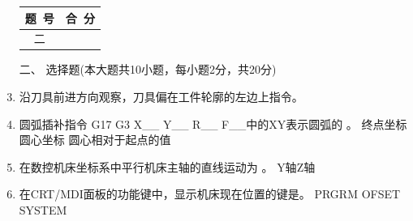 \documentclass[12pt,twocolumn,landscape,UTF8,twoside]{ctexart}
\begin{document}
\begin{spacing}{1.3}
\begin{enumerate} [1、]
\vspace{0.5cm}

\item[\heiti
\begin{minipage}{\@}	\begin{tabular}{|c|c|}\hline
		题~号 & 合~分\\ \hline		二&       \\\hline	\end{tabular}
\end{minipage} ]

\item[\heiti 二、]{\heiti 选择题(本大题共10小题，每小题2分，共20分)}	
		
\item 沿刀具前进方向观察，刀具偏在工件轮廓的左边上指令。
\item 圆弧插补指令 G17 G3 X\_\_ Y\_\_ R\_\_ F\_\_中的XY表示圆弧的	。
	{终点坐标}	{圆心坐标}	{圆心相对于起点的值}
\item 在数控机床坐标系中平行机床主轴的直线运动为	。
	{Y轴}{Z轴}
\item 在CRT/MDI面板的功能键中，显示机床现在位置的键是。
	{PRGRM}	{OFSET}	{SYSTEM}

\end{enumerate}
\end{spacing}
\end{document}
